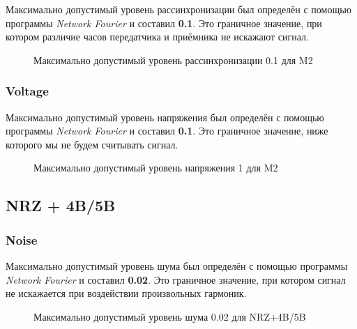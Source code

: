 Максимально допустимый уровень рассинхронизации был определён с помощью программы \textit{Network Fourier} и составил \textbf{0.1}. Это граничное значение, при котором различие часов передатчика и приёмника не искажают сигнал.

\vspace{0.4cm}
\begin{figure}[h]
	\centering
	\caption{Максимально допустимый уровень рассинхронизации 0.1 для M2}
\end{figure}

\subsubsection{Voltage}

Максимально допустимый уровень напряжения был определён с помощью программы \textit{Network Fourier} и составил \textbf{0.1}. Это граничное значение, ниже которого мы не будем считывать сигнал.

\vspace{0.4cm}
\begin{figure}[h]
	\centering
	\caption{Максимально допустимый уровень напряжения 1 для M2}
\end{figure}




\newpage
\subsection{NRZ + 4B/5B}

\subsubsection{Noise}

Максимально допустимый уровень шума был определён с помощью программы \textit{Network Fourier} и составил \textbf{0.02}. Это граничное значение, при котором сигнал не искажается при воздействии произвольных гармоник.

\vspace{0.4cm}
\begin{figure}[h]
	\centering
	\caption{Максимально допустимый уровень шума 0.02 для NRZ+4B/5B}
\end{figure}

